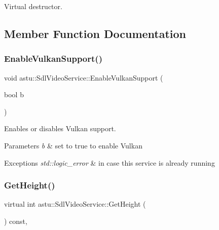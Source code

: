 Virtual destructor. 

\subsection{Member Function Documentation}
\mbox{\label{classastu_1_1SdlVideoService_a33679f9d46b5aa38c0b75b3b7f16705d}} 
\subsubsection{\texorpdfstring{Enable\+Vulkan\+Support()}{EnableVulkanSupport()}}
{\footnotesize\ttfamily void astu\+::\+Sdl\+Video\+Service\+::\+Enable\+Vulkan\+Support (\begin{DoxyParamCaption}\item[{bool}]{b }\end{DoxyParamCaption})}

Enables or disables Vulkan support.


\begin{DoxyParams}{Parameters}
{\em b} & set to {\ttfamily true} to enable Vulkan \\
\hline
\end{DoxyParams}

\begin{DoxyExceptions}{Exceptions}
{\em std\+::logic\+\_\+error} & in case this service is already running \\
\hline
\end{DoxyExceptions}
\mbox{\label{classastu_1_1SdlVideoService_a76d0f56254c9545d4d9762349133d4af}} 
\subsubsection{\texorpdfstring{Get\+Height()}{GetHeight()}}
{\footnotesize\ttfamily virtual int astu\+::\+Sdl\+Video\+Service\+::\+Get\+Height (\begin{DoxyParamCaption}{ }\end{DoxyParamCaption}) const\hspace{0.3cm}{\ttfamily [override]}, {\ttfamily [virtual]}}

